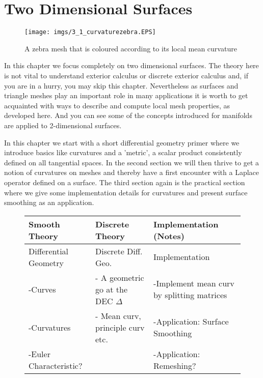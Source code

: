 \newpage
\chapter{Two Dimensional Surfaces}

\begin{figure}[h]
\begin{center}
\texttt{[image: imgs/3\_1\_curvaturezebra.EPS]}
\end{center}
\caption{A zebra mesh that is coloured according to its local mean curvature}
\end{figure}

In this chapter we focus completely on two dimensional surfaces. The theory here is not vital to understand exterior calculus or discrete exterior calculus and, if you are in a hurry, you may skip this chapter. Nevertheless as surfaces and triangle meshes play an important role in many applications it is worth to get acquainted with ways to describe and compute local mesh properties, as developed here. And you can see some of the concepts introduced for manifolds are applied to 2-dimensional surfaces.

In this chapter we start with a short differential geometry primer where we introduce basics like curvatures and a 'metric', a scalar product consistently defined on all tangential spaces. In the second section we will then thrive to get a notion of curvatures on meshes and thereby have a first encounter with a Laplace operator defined on a surface. The third section again is the practical section where we give some implementation details for curvatures and present surface smoothing as an application.

\begin{figure}[ht]
\begin{longtable}{|p{4.5cm}|p{4.5cm}|p{4.5cm}|}
\hline
Smooth Theory& Discrete Theory& Implementation (Notes)\\
\hline
Differential Geometry & Discrete Diff. Geo. & Implementation\\
-Curves & - A geometric go at the DEC $\Delta$ & -Implement mean curv by splitting matrices\\
-Curvatures & - Mean curv, principle curv etc.& -Application: Surface Smoothing\\
-Euler Characteristic? & & -Application: Remeshing? \\			
\hline
\end{longtable}
\end{figure}

